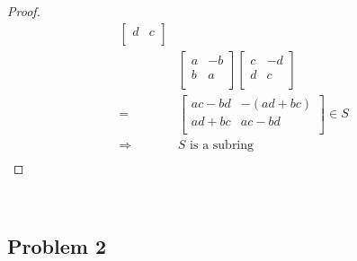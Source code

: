\documentclass{article}
\begin{document}
\begin{proof}
\begin{align*}
\begin{bmatrix}
            d&c\\
        \end{bmatrix}\\
        &\begin{bmatrix}
            a&-b\\
            b&a\\
        \end{bmatrix}\begin{bmatrix}
            c&-d\\
            d&c\\
        \end{bmatrix}\\
        =&\begin{bmatrix}
            ac-bd&-(ad+bc)\\
            ad+bc&ac-bd\\
        \end{bmatrix}\in S\\
        \Rightarrow&S\text{ is a subring}\\
    \end{align*}
\end{proof}

~

\subsection*{Problem 2}

~
\end{document}
